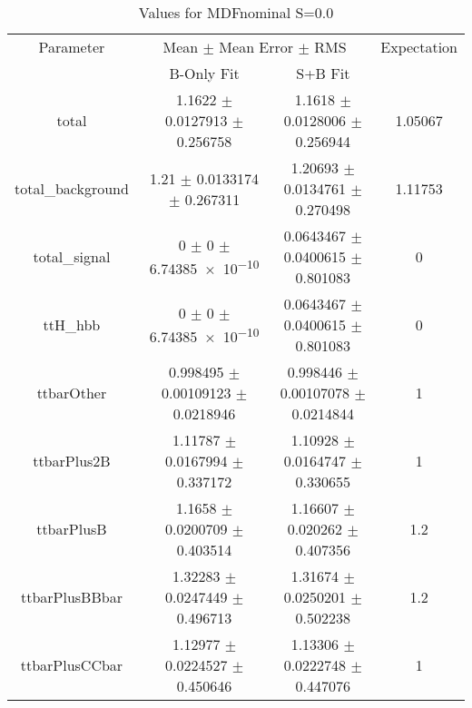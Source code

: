 \begin{table}
\centering
\caption{Values for MDFnominal S=0.0}
\begin{tabular}{cccc}
\toprule
Parameter & \multicolumn{2}{c}{Mean $\pm$ Mean Error $\pm$ RMS} & Expectation\\
 & B-Only Fit & S+B Fit & \\
\midrule
total & \num{1.1622} $\pm$ \num{0.0127913} $\pm$ \num{0.256758} & \num{1.1618} $\pm$ \num{0.0128006} $\pm$ \num{0.256944} & \num{1.05067}\\
total\_background & \num{1.21} $\pm$ \num{0.0133174} $\pm$ \num{0.267311} & \num{1.20693} $\pm$ \num{0.0134761} $\pm$ \num{0.270498} & \num{1.11753}\\
total\_signal & \num{0} $\pm$ \num{0} $\pm$ \num{6.74385e-10} & \num{0.0643467} $\pm$ \num{0.0400615} $\pm$ \num{0.801083} & \num{0}\\
ttH\_hbb & \num{0} $\pm$ \num{0} $\pm$ \num{6.74385e-10} & \num{0.0643467} $\pm$ \num{0.0400615} $\pm$ \num{0.801083} & \num{0}\\
ttbarOther & \num{0.998495} $\pm$ \num{0.00109123} $\pm$ \num{0.0218946} & \num{0.998446} $\pm$ \num{0.00107078} $\pm$ \num{0.0214844} & \num{1}\\
ttbarPlus2B & \num{1.11787} $\pm$ \num{0.0167994} $\pm$ \num{0.337172} & \num{1.10928} $\pm$ \num{0.0164747} $\pm$ \num{0.330655} & \num{1}\\
ttbarPlusB & \num{1.1658} $\pm$ \num{0.0200709} $\pm$ \num{0.403514} & \num{1.16607} $\pm$ \num{0.020262} $\pm$ \num{0.407356} & \num{1.2}\\
ttbarPlusBBbar & \num{1.32283} $\pm$ \num{0.0247449} $\pm$ \num{0.496713} & \num{1.31674} $\pm$ \num{0.0250201} $\pm$ \num{0.502238} & \num{1.2}\\
ttbarPlusCCbar & \num{1.12977} $\pm$ \num{0.0224527} $\pm$ \num{0.450646} & \num{1.13306} $\pm$ \num{0.0222748} $\pm$ \num{0.447076} & \num{1}\\
\bottomrule
\end{tabular}
\end{table}